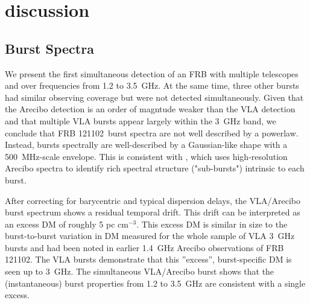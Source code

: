 \documentclass[twocolumn]{aastex61}
\newcommand{\frb}{FRB 121102}
\begin{document}
%
%

\section{discussion}
\label{sec:disc}
\subsection{Burst Spectra}
We present the first simultaneous detection of an FRB with multiple telescopes and over frequencies from 1.2 to 3.5~GHz. At the same time, three other bursts had similar observing coverage but were not detected simultaneously. Given that the Arecibo detection is an order of magntude weaker than the VLA detection and that multiple VLA bursts appear largely within the 3~GHz band, we conclude that \frb\ burst spectra are not well described by a powerlaw. Instead, bursts spectrally are well-described by a Gaussian-like shape with a 500~MHz-scale envelope. This is consistent with \citet{WEIRD}, which uses high-resolution Arecibo spectra to identify rich spectral structure ("sub-bursts") intrinsic to each burst.

After correcting for barycentric and typical dispersion delays, the VLA/Arecibo burst spectrum shows a residual temporal drift. This drift can be interpreted as an excess DM of roughly 5 pc cm$^{-3}$. This excess DM is similar in size to the burst-to-burst variation in DM measured for the whole sample of VLA 3~GHz bursts and had been noted in earlier 1.4~GHz Arecibo observations of \frb \citep{2016arXiv160308880S}. The VLA bursts demonstrate that this ''excess'', burst-specific DM is seen up to 3~GHz. The simultaneous VLA/Arecibo burst shows that the (instantaneous) burst properties from 1.2 to 3.5~GHz are consistent with a single excess. 
\end{document}
